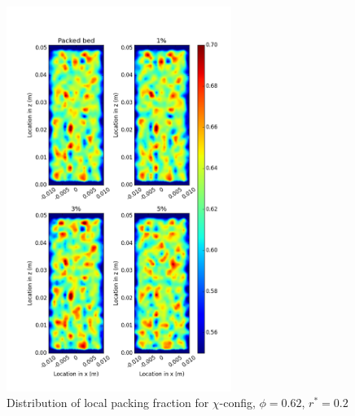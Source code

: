 \begin{figure}[!t]
    \centering
    \includegraphics[width = 0.65\textwidth]{figures/x-62-r125-1.png}
    \caption{Distribution of local packing fraction for $\chi$-config, $\phi = 0.62$, $r^* = 0.2$}\label{fig:x-62-r125}
\end{figure}

